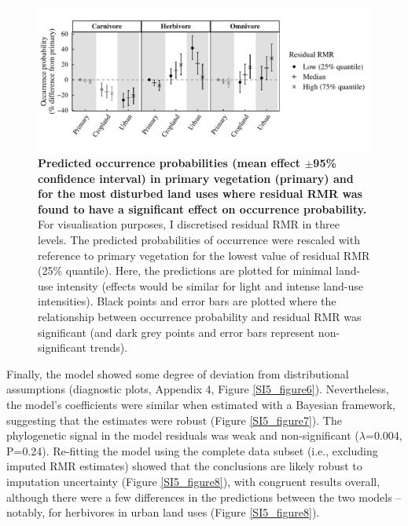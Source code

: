 \begin{figure}[h!]
\centering
\includegraphics[scale=0.65]{figures/Chapter5/Figure5}
\caption[Predicted occurrence probabilities in primary vegetation and for the most disturbed land uses where residual RMR was found to have a significant effect on occurrence probability]{\textbf{Predicted occurrence probabilities (mean effect $\pm$95\% confidence interval) in primary vegetation (primary) and for the most disturbed land uses where residual RMR was found to have a significant effect on occurrence probability.} For visualisation purposes, I discretised residual RMR in three levels. The predicted probabilities of occurrence were rescaled with reference to primary vegetation for the lowest value of residual RMR (25\% quantile). Here, the predictions are plotted for minimal land-use intensity (effects would be similar for light and intense land-use intensities). Black points and error bars are plotted where the relationship between occurrence probability and residual RMR was significant (and dark grey points and error bars represent non-significant trends).}
\label{chap5_fig5}
\end{figure}

Finally, the model showed some degree of deviation from distributional assumptions (diagnostic plots, Appendix 4, Figure \ref{SI5_figure6}). Nevertheless, the model's coefficients were similar when estimated with a Bayesian framework, suggesting that the estimates were robust (Figure \ref{SI5_figure7}). The phylogenetic signal in the model residuals was weak and non-significant ($\lambda$=0.004, P=0.24). Re-fitting the model using the complete data subset (i.e., excluding imputed RMR estimates) showed that the conclusions are likely robust to imputation uncertainty (Figure \ref{SI5_figure8}), with congruent results overall, although there were a few differences in the predictions between the two models – notably, for herbivores in urban land uses (Figure \ref{SI5_figure8}).  


